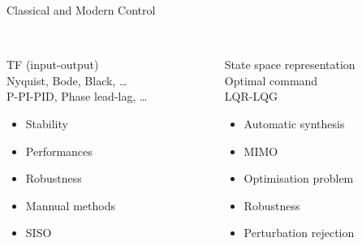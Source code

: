 \documentclass[../main/main.tex]{subfiles}
\begin{document}
\begin{frame}[t]{Classical and Modern Control}
  \begin{columns}
    \begin{column}{0.5\textwidth}
      \\\vspace{1em}
      TF (input-output)\\
      Nyquist, Bode, Black, \ldots\\
      P-PI-PID, Phase lead-lag, \ldots\vspace{1em}
      \begin{tcolorbox}[size=small, top=4pt, colback=green!5!white,colframe=green!75!black,title=Advantages]
        \begin{itemize}
        \item Stability
        \item Performances
        \item Robustness %
        \end{itemize}
      \end{tcolorbox}\vspace{1em}
      \begin{tcolorbox}[size=small, colback=red!5!white,colframe=red!75!black,title=Disadvantages]
        \begin{itemize}
        \item Mannual methods
        \item SISO
        \end{itemize}
      \end{tcolorbox}
    \end{column}
    \begin{column}{0.5\textwidth}
      \\\vspace{1em}
      State space representation\\
      Optimal command\\
      LQR-LQG\vspace{1em}
      \begin{tcolorbox}[size=small, colback=green!5!white,colframe=green!75!black,title=Advantages]
        \begin{itemize}
        \item Automatic synthesis
        \item MIMO
        \item Optimisation problem
        \end{itemize}
      \end{tcolorbox}\vspace{1em}
      \begin{tcolorbox}[size=small, colback=red!5!white,colframe=red!75!black,title=Disadvantages]
        \begin{itemize}
        \item Robustness
        \item Perturbation rejection
        \end{itemize}
      \end{tcolorbox}
    \end{column}
  \end{columns}
\end{frame}
\end{document}
